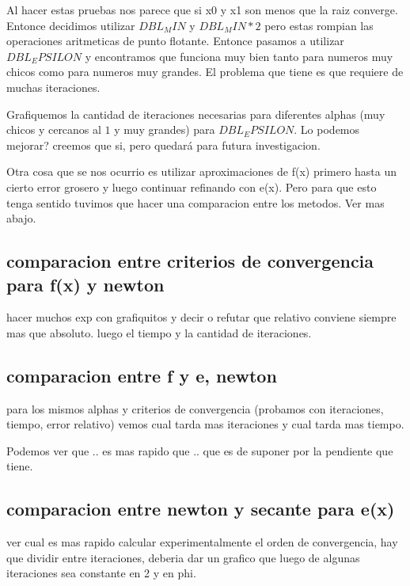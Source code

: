 Al hacer estas pruebas nos parece que si x0 y x1 son menos que la raiz
converge. Entonce decidimos utilizar $DBL_MIN$ y $DBL_MIN * 2$ pero estas rompian
las operaciones aritmeticas de punto flotante. Entonce pasamos a utilizar
$DBL_EPSILON$ y encontramos que funciona muy bien tanto para numeros muy chicos
como para numeros muy grandes. El problema que tiene es que requiere de muchas
iteraciones.

Grafiquemos la cantidad de iteraciones necesarias para diferentes alphas (muy
chicos y cercanos al $1$ y muy grandes) para $DBL_EPSILON$. Lo podemos mejorar?
creemos que si, pero quedará para futura investigacion.

Otra cosa que se nos ocurrio es utilizar aproximaciones de f(x) primero hasta
un cierto error grosero y luego continuar refinando con e(x). Pero para que
esto tenga sentido tuvimos que hacer una comparacion entre los metodos. Ver mas
abajo.

\subsection{comparacion entre criterios de convergencia para f(x) y newton}

hacer muchos exp con grafiquitos y decir o refutar que relativo conviene
siempre mas que absoluto. luego el tiempo y la cantidad de iteraciones.

\subsection{comparacion entre f y e, newton}

para los mismos alphas y criterios de convergencia (probamos con iteraciones,
tiempo, error relativo) vemos cual tarda mas iteraciones y cual tarda mas
tiempo.

Podemos ver que .. es mas rapido que .. que es de suponer por la pendiente que
tiene.

\subsection{comparacion entre newton y secante para e(x)}

ver cual es mas rapido
calcular experimentalmente el orden de convergencia, hay que dividir entre
iteraciones, deberia dar un grafico que luego de algunas iteraciones sea
constante en 2 y en phi.
